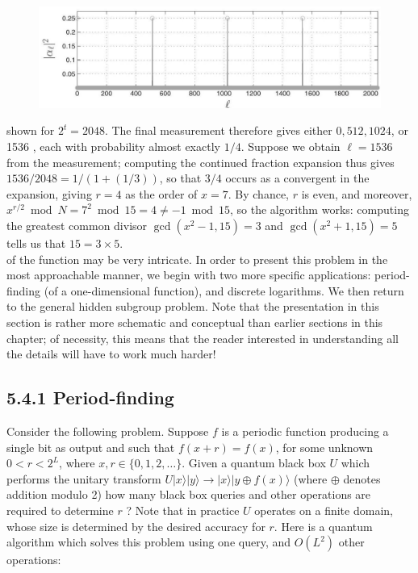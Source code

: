 \begin{figure}
\centering
\includegraphics[width=0.75\linewidth]{Images/2024_05_17_6977ce60de6fd27aef98g-269}
\end{figure}

shown for $2^{t}=2048$. The final measurement therefore gives either $0,512,1024$, or 1536 , each with probability almost exactly $1 / 4$. Suppose we obtain $\ell=1536$ from the measurement; computing the continued fraction expansion thus gives $1536 / 2048=1 /(1+(1 / 3))$, so that $3 / 4$ occurs as a convergent in the expansion, giving $r=4$ as the order of $x=7$. By chance, $r$ is even, and moreover, $x^{r / 2} \bmod N=7^{2} \bmod 15=4 \neq-1 \bmod 15$, so the algorithm works: computing the greatest common divisor $\operatorname{gcd}\left(x^{2}-1,15\right)=3$ and $\operatorname{gcd}\left(x^{2}+1,15\right)=5$ tells us that $15=3 \times 5$.\\
of the function may be very intricate. In order to present this problem in the most approachable manner, we begin with two more specific applications: period-finding (of a one-dimensional function), and discrete logarithms. We then return to the general hidden subgroup problem. Note that the presentation in this section is rather more schematic and conceptual than earlier sections in this chapter; of necessity, this means that the reader interested in understanding all the details will have to work much harder!

\subsection*{5.4.1 Period-finding}
Consider the following problem. Suppose $f$ is a periodic function producing a single bit as output and such that $f(x+r)=f(x)$, for some unknown $0<r<2^{L}$, where $x, r \in\{0,1,2, \ldots\}$. Given a quantum black box $U$ which performs the unitary transform $U|x\rangle|y\rangle \rightarrow|x\rangle|y \oplus f(x)\rangle$ (where $\oplus$ denotes addition modulo 2) how many black box queries and other operations are required to determine $r$ ? Note that in practice $U$ operates on a finite domain, whose size is determined by the desired accuracy for $r$. Here is a quantum algorithm which solves this problem using one query, and $O\left(L^{2}\right)$ other operations:

